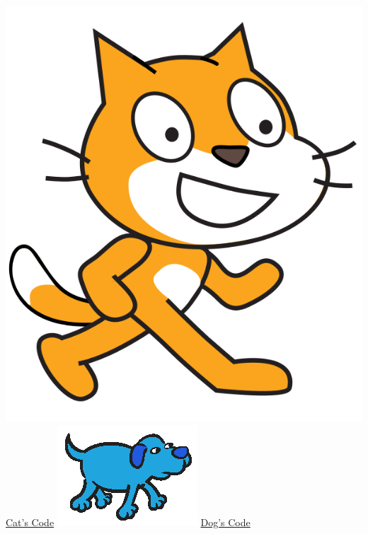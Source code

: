 \documentclass[letterpaper,12pt]{article}
\begin{document}
\indent \includegraphics[scale=.25,valign=c]{cat.png} \underline{Cat's Code} \hspace{5cm}
\includegraphics[scale=.2,valign=c]{dog.png} \underline{Dog's Code} \\
\end{document}
